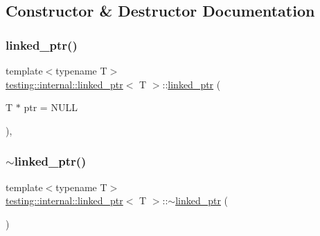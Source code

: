 \subsection{Constructor \& Destructor Documentation}
\mbox{\label{classtesting_1_1internal_1_1linked__ptr_ae805418b9f03f14ff49649e710475dba}} 
\subsubsection{\texorpdfstring{linked\_ptr()}{linked\_ptr()}\hspace{0.1cm}{\footnotesize\ttfamily [1/3]}}
{\footnotesize\ttfamily template$<$typename T$>$ \\
\mbox{\hyperlink{classtesting_1_1internal_1_1linked__ptr}{testing\+::internal\+::linked\+\_\+ptr}}$<$ T $>$\+::\mbox{\hyperlink{classtesting_1_1internal_1_1linked__ptr}{linked\+\_\+ptr}} (\begin{DoxyParamCaption}\item[{T $\ast$}]{ptr = {\ttfamily NULL} }\end{DoxyParamCaption})\hspace{0.3cm}{\ttfamily [inline]}, {\ttfamily [explicit]}}

\mbox{\label{classtesting_1_1internal_1_1linked__ptr_af99460fd09ca0f83e061ea480ef1a45e}} 
\subsubsection{\texorpdfstring{$\sim$linked\_ptr()}{~linked\_ptr()}}
{\footnotesize\ttfamily template$<$typename T$>$ \\
\mbox{\hyperlink{classtesting_1_1internal_1_1linked__ptr}{testing\+::internal\+::linked\+\_\+ptr}}$<$ T $>$\+::$\sim$\mbox{\hyperlink{classtesting_1_1internal_1_1linked__ptr}{linked\+\_\+ptr}} (\begin{DoxyParamCaption}{ }\end{DoxyParamCaption})\hspace{0.3cm}{\ttfamily [inline]}}

